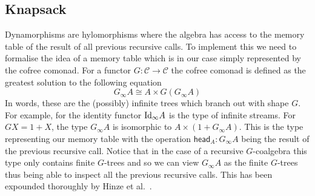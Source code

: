 \documentclass[a4paper,UKenglish,cleveref, autoref, thm-restate]{lipics-v2021}
\newcommand{\operator}[1]{\textsf{#1}}
\newcommand{\head}{\operator{head}}
\newcommand{\CatC}{\mathcal{C}}
\newcommand{\iso}{\cong}
\begin{document}
\subsection{Knapsack}\label{sec:knap}
Dynamorphisms are hylomorphisms where the algebra has access to the memory table
of the result of all previous recursive calls. To implement this we need to
formalise the idea of a memory table which is in our case simply represented by
the cofree comonad. For a functor $G : \CatC \to \CatC$ the cofree comonad is
defined as the greatest solution to the following equation
\[
  G_{\infty} A \iso A \times G (G_{\infty} A)
\]
In words, these are the (possibly) infinite trees which branch out with shape
$G$. For example, for the identity functor $\text{Id}_{\infty} A$ is the type of
infinite streams. For $G X = 1 + X$, the type $G_{\infty} A$ is isomorphic to
$A \times (1 + G_{\infty} A)$. This is the type representing our memory table
with the operation $\head_{A} : G_{\infty} A$ being the result of the previous
recursive call. Notice that in the case of a recursive $G$-coalgebra this type
only contains finite $G$-trees and so we can view $G_{\infty}A$ as the finite
$G$-trees thus being able to inspect all the previous recursive calls. This has
been expounded thoroughly by Hinze et al.~\cite{HinzeWG15}.
\end{document}
